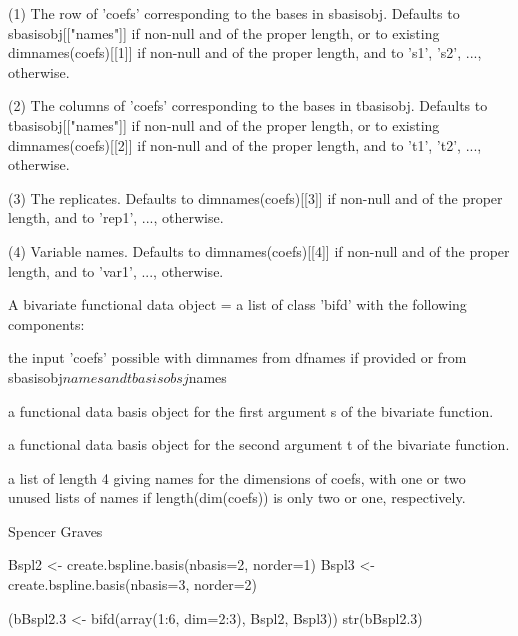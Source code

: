 \documentclass{article}
\begin{document}
\begin{Arguments}
\begin{ldescription}
(1) The row of 'coefs' corresponding to the bases in sbasisobj.
Defaults to sbasisobj[["names"]] if non-null and of the proper
length, or to existing dimnames(coefs)[[1]] if non-null and of the
proper length, and to 's1', 's2', ...,
otherwise.  

(2) The columns of 'coefs' corresponding to the bases in tbasisobj.
Defaults to tbasisobj[["names"]] if non-null and of the proper
length, or to existing dimnames(coefs)[[2]] if non-null and of the
proper length, and to 't1', 't2', ...,  
otherwise.  

(3) The replicates.  Defaults to dimnames(coefs)[[3]] if non-null
and of the proper length, and to 'rep1', ..., otherwise.

(4) Variable names.  Defaults to dimnames(coefs)[[4]] if non-null
and of the proper length, and to 'var1', ..., otherwise.  

\end{ldescription}
\end{Arguments}
\begin{Value}
A bivariate functional data object = a list of class 'bifd' 
with the following components:

\begin{ldescription}
\item[\code{coefs}] the input 'coefs' possible with dimnames from dfnames if provided or
from sbasisobj$names and tbasisobsj$names

\item[\code{sbasisobj}] a functional data basis object
for the first argument s of the bivariate function.  

\item[\code{tbasisobj}] a functional data basis object
for the second argument t of the bivariate function.  

\item[\code{bifdnames}] a list of length 4 giving names for the dimensions of coefs, with
one or two unused lists of names if length(dim(coefs)) is only two
or one, respectively.  

\end{ldescription}
\end{Value}
\begin{Author}\relax
Spencer Graves
\end{Author}
\begin{SeeAlso}\relax
{}
\end{SeeAlso}
\begin{Examples}
\begin{ExampleCode}
Bspl2 <- create.bspline.basis(nbasis=2, norder=1)
Bspl3 <- create.bspline.basis(nbasis=3, norder=2)

(bBspl2.3 <- bifd(array(1:6, dim=2:3), Bspl2, Bspl3))
str(bBspl2.3)

\end{ExampleCode}
\end{Examples}
\end{document}

